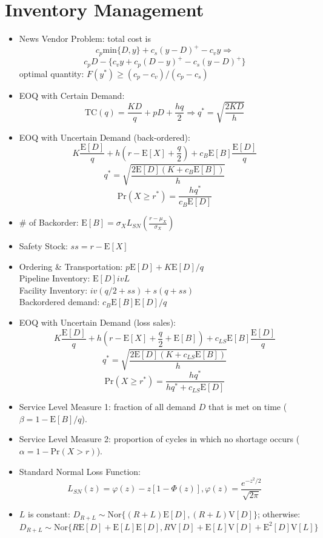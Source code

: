\documentclass[10pt, twocolumn]{article}
\begin{document}
\section*{Inventory Management} \vspace*{-1em}
\begin{itemize}
\item News Vendor Problem: total cost is 
\[ c_p\text{min}\{D,y\} + c_s(y-D)^+ - c_vy \Rightarrow \]
\[ c_pD - \{c_vy + c_p(D-y)^+ - c_s(y-D)^+\} \]
optimal quantity: $F(y^*) \geq (c_p-c_v)/(c_p-c_s)$
\item EOQ with Certain Demand: 
\[ \text{TC}(q) = \frac{KD}{q} + pD + \frac{hq}{2} \Rightarrow 
q^* = \sqrt{\frac{2KD}{h}} \]
\item EOQ with Uncertain Demand (back-ordered): 
\[ K\frac{\text{E}[D]}{q} + h(r-\text{E}[X]+\frac{q}{2}) + c_B\text{E}[B]\frac{\text{E}[D]}{q} \]
\[ q^* = \sqrt{\frac{2\text{E}[D](K+c_B\text{E}[B])}{h}} \]
\[ \text{Pr}(X \geq r^*) = \frac{hq^*}{c_B\text{E}[D]} \]
\item \# of Backorder: $\text{E}[B]=\sigma_XL_{SN}(\frac{r-\mu_X}{\sigma_X})$
\item Safety Stock: $ss = r-\text{E}[X]$
\item Ordering \& Transportation: $p\text{E}[D]+K\text{E}[D]/q$ \\
Pipeline Inventory: $\text{E}[D]ivL$ \\
Facility Inventory: $iv(q/2+ss)+s(q+ss)$ \\
Backordered demand: $c_B\text{E}[B]\text{E}[D]/q$
\item EOQ with Uncertain Demand (loss sales):
\[ K\frac{\text{E}[D]}{q} + h(r-\text{E}[X]+\frac{q}{2}+\text{E}[B]) + c_{LS}\text{E}[B]\frac{\text{E}[D]}{q} \]
\[ q^* = \sqrt{\frac{2\text{E}[D](K+c_{LS}\text{E}[B])}{h}} \]
\[ \text{Pr}(X \geq r^*) = \frac{hq^*}{hq^*+c_{LS}\text{E}[D]} \]
\item Service Level Measure 1: fraction of all demand $D$ that is met on time ($\beta=1-\text{E}[B]/q$).
\item Service Level Measure 2: proportion of cycles in which no shortage occurs ($\alpha=1-\text{Pr}(X>r)$).
\item Standard Normal Loss Function: %
\[ L_{SN}(z) = \varphi(z) - z[1-\Phi(z)], \varphi(z)=\frac{e^{-z^2/2}}{\sqrt{2\pi}} \]
\item $L$ is constant: $D_{R+L} \sim \text{Nor}\{(R+L)\text{E}[D], (R+L)\text{V}[D]\}$; otherwise: $D_{R+L} \sim \text{Nor}\{R\text{E}[D]+\text{E}[L]\text{E}[D], R\text{V}[D]+\text{E}[L]\text{V}[D]+\text{E}^2[D]\text{V}[L]\}$

\end{itemize}
\end{document}
